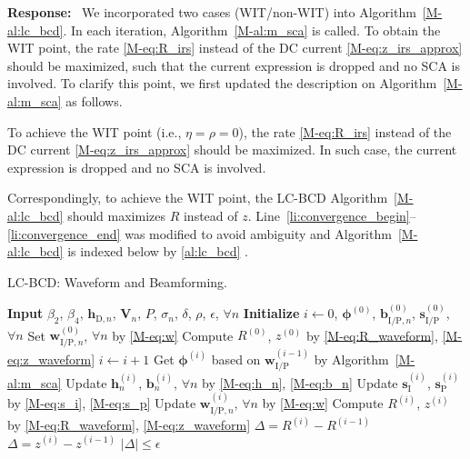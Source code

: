 \documentclass{article}
\newcounter{reviewer}
\newcounter{point}[reviewer]
\newcounter{response}[reviewer]
\newenvironment{response}
	{\refstepcounter{response} \medskip \noindent \textbf{Response:}\ }
	{\medskip}
\begin{document}
\begin{reviewer}
		\begin{response}
			We incorporated two cases (WIT/non-WIT) into Algorithm~\ref{M-al:lc_bcd}. In each iteration, Algorithm~\ref{M-al:m_sca} is called. To obtain the WIT point, the rate \eqref{M-eq:R_irs} instead of the DC current \eqref{M-eq:z_irs_approx} should be maximized, such that the current expression is dropped and no SCA is involved. To clarify this point, we first updated the description on Algorithm~\ref{M-al:m_sca} as follows.
			\begin{framed}
				To achieve the WIT point (i.e., $\eta=\rho=0$), the rate \eqref{M-eq:R_irs} instead of the DC current \eqref{M-eq:z_irs_approx} should be maximized. In such case, the current expression is dropped and no SCA is involved.
			\end{framed}
			Correspondingly, to achieve the WIT point, the LC-BCD Algorithm~\ref{M-al:lc_bcd} should maximizes $R$ instead of $z$. Line~\ref{li:convergence_begin}--\ref{li:convergence_end} was modified to avoid ambiguity and Algorithm~\ref{M-al:lc_bcd} is indexed below by \ref{al:lc_bcd} .
			\begin{algorithm}[!h]
				\caption{LC-BCD: Waveform and Beamforming.}
				\label{al:lc_bcd}
				\begin{algorithmic}[1]
					\State \textbf{Input} $\beta_2$, $\beta_4$, $\boldsymbol{h}_{\mathrm{D},n}$, $\boldsymbol{V}_{n}$, $P$, $\sigma_n$, $\delta$, $\rho$, $\epsilon$, $\forall n$
					\State \textbf{Initialize} $i \gets 0$, $\boldsymbol{\phi}^{(0)}$, $\boldsymbol{b}_{\mathrm{I/P},n}^{(0)}$, $\boldsymbol{s}_{\mathrm{I/P}}^{(0)}$, $\forall n$
					\State Set $\boldsymbol{w}_{\mathrm{I/P},n}^{(0)}$, $\forall n$ by \eqref{M-eq:w}
					\State Compute $R^{(0)}$, $z^{(0)}$ by \eqref{M-eq:R_waveform}, \eqref{M-eq:z_waveform}
					\Repeat
						\State $i \gets i + 1$
						\State Get $\boldsymbol{\phi}^{(i)}$ based on $\boldsymbol{w}_{\mathrm{I/P}}^{(i-1)}$ by Algorithm~\ref{M-al:m_sca}
						\State Update $\boldsymbol{h}_n^{(i)}$, $\boldsymbol{b}_n^{(i)}$, $\forall n$ by \eqref{M-eq:h_n}, \eqref{M-eq:b_n}
						\State Update $\boldsymbol{s}_{\mathrm{I}}^{(i)}$, $\boldsymbol{s}_{\mathrm{P}}^{(i)}$ by \eqref{M-eq:s_i}, \eqref{M-eq:s_p}
						\State Update $\boldsymbol{w}_{\mathrm{I/P},n}^{(i)}$, $\forall n$ by \eqref{M-eq:w}
						\State Compute $R^{(i)}$, $z^{(i)}$ by \eqref{M-eq:R_waveform}, \eqref{M-eq:z_waveform}
						 \label{li:convergence_begin}
							\State $\Delta = R^{(i)} - R^{(i-1)}$
						\Else
							\State $\Delta = z^{(i)} - z^{(i-1)}$
						\EndIf
					\Until $\lvert \Delta \rvert \le \epsilon$ \label{li:convergence_end}

\end{algorithmic}
\end{algorithm}
\end{response}
\end{reviewer}
\end{document}
